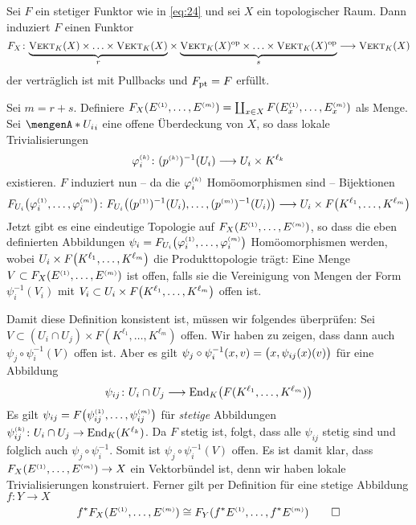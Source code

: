 \begin{lemma}[{name=[Induzierter Funktor eines stetigen Funktors]},label=ind_funk_vektorbuendel]
Sei $F$ ein stetiger Funktor wie in \eqref{eq:24} und sei $X$ ein topologischer Raum. Dann induziert $F$ einen Funktor
\[
	F_X \colon \Underbrace{\VEKT_K(X) \times \ldots \times \VEKT_K(X)}{r} \times \Underbrace{\VEKT_K(X)^\op \times \ldots \times \VEKT_K(X)^\op}{s} \longrightarrow \VEKT_K(X)
\]
der verträglich ist mit Pullbacks und $F_\pt=F$ erfüllt.
\end{lemma}
\begin{beweis}
Sei $m=r+s$. Definiere 
\(
	F_X \enbrace*{E^\ssbrace{1}, \ldots , E^\ssbrace{m}} = \coprod_{x \in X} F \enbrace*{E_x^\ssbrace{1}, \ldots , E_x^\ssbrace{m}}   
\)
als Menge. Sei $\set{U_i}_i$ eine offene Überdeckung von $X$, so dass lokale Trivialisierungen 
\[
	\varphi_i^\ssbrace{k} \colon (p^\ssbrace{k})^{-1}(U_i) \longrightarrow U_i \times K^{\ell_k}
\]
existieren. $F$ induziert nun -- da die $\varphi_i^\ssbrace{k}$ Homöomorphismen sind -- Bijektionen
\[
	F_{U_i} \enbrace*{\varphi_i^\ssbrace{1}, \ldots , \varphi_i^\ssbrace{m}} \colon F_{U_i} \enbrace*{(p^\ssbrace{1})^{-1}(U_i), \ldots , (p^\ssbrace{m})^{-1}(U_i)}
	\longrightarrow U_i \times F \enbrace*{K^{\ell_1}, \ldots , K^{\ell_m}}   
\]
Jetzt gibt es eine eindeutige Topologie auf $F_X \enbrace*{E^\ssbrace{1}, \ldots , E^\ssbrace{m}}$, so dass die eben definierten Abbildungen 
$\psi_i = F_{U_i} \enbrace*{\varphi_i^\ssbrace{1}, \ldots , \varphi_i^\ssbrace{m}}$ Homöomorphismen werden, wobei $U_i \times F \enbrace*{K^{\ell_1}, \ldots , K^{\ell_m}}$ 
die Produkttopologie trägt: Eine Menge $V \subset F_X \enbrace*{E^\ssbrace{1}, \ldots , E^\ssbrace{m}}$ ist offen, falls sie die Vereinigung von Mengen der Form 
$\psi_i^{-1}(V_i)$ mit $V_i \subset U_i \times F \enbrace*{K^{\ell_1}, \ldots , K^{\ell_m}}$ offen ist.

Damit diese Definition konsistent ist, müssen wir folgendes überprüfen: Sei $V \subset (U_i \cap U_j) \times F(K^{\ell_1}, \ldots , K^{\ell_m})$ offen. Wir haben zu zeigen, dass 
dann auch $\psi_j \circ \psi_i^{-1}(V)$ offen ist. Aber es gilt $\psi_j \circ \psi_i ^{-1}(x,v)= \enbrace[\big]{x, \psi_{ij}(x)(v)}$ für eine Abbildung
\[
	\psi_{ij} \colon U_i  \cap U_j \longrightarrow \End_K \enbrace*{F(K^{\ell_1}, \ldots , K^{\ell_m})} 
\]
Es gilt $\psi_{ij} = F \enbrace[\big]{\psi_{ij}^\ssbrace{1}, \ldots , \psi_{ij}^\ssbrace{m}}$ für \emph{stetige} Abbildungen 
$\psi_{ij}^\ssbrace{k} \colon U_i \cap U_j \to \End_K(K^{\ell_k})$. Da $F$ stetig ist, folgt, dass alle $\psi_{ij}$ stetig sind und folglich auch $\psi_j \circ \psi_i ^{-1}$. 
Somit ist $\psi_j \circ \psi_i ^{-1}(V)$ offen. Es ist damit klar, dass $F_X \enbrace*{E^\ssbrace{1}, \ldots , E^\ssbrace{m}} \to X$ ein Vektorbündel ist, denn wir haben lokale Trivialisierungen konstruiert. Ferner gilt per Definition für eine stetige Abbildung $f \colon Y \to X$
\[
	f^* F_X \enbrace*{E^\ssbrace{1}, \ldots , E^\ssbrace{m}} \cong F_Y \enbrace*{f^*E^\ssbrace{1}, \ldots , f^* E^\ssbrace{m}} \qedhere
\]	
\end{beweis}

